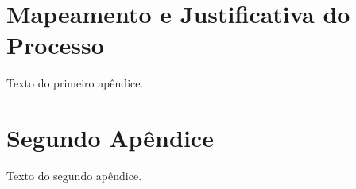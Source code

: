 \begin{apendicesenv}

\partapendices

\chapter{Mapeamento e Justificativa do Processo }

Texto do primeiro apêndice.

\chapter{Segundo Apêndice}

Texto do segundo apêndice.

\end{apendicesenv}
